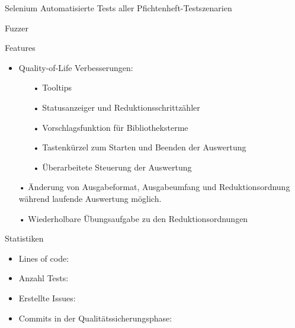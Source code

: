 \documentclass[10pt]{beamer}
\begin{document}
\begin{frame}{Selenium}
Automatisierte Tests aller Pfichtenheft-Testszenarien
\end{frame}

\begin{frame} {Fuzzer}

\end{frame}

\begin{frame}{Features}
\begin{itemize}
\item Quality-of-Life Verbesserungen:
\begin{itemize}
\item[•] Tooltips
\item[•] Statusanzeiger und Reduktionsschrittzähler
\item[•] Vorschlagsfunktion für Bibliotheksterme
\item[•] Tastenkürzel zum Starten und Beenden der Auswertung
\item[•] Überarbeitete Steuerung der Auswertung
\end{itemize}
\item[•] Änderung von Ausgabeformat, Ausgabeumfang und Reduktionsordnung während laufende Auswertung möglich.
\item[•] Wiederholbare Übungsaufgabe zu den Reduktionsordnungen
\end{itemize}
\end{frame}

\begin{frame}{Statistiken} %
\begin{itemize}
\item Lines of code:
\item Anzahl Tests:
\item Erstellte Issues:
\item Commits in der Qualitätssicherungsphase:
\end{itemize}
\end{frame}
\end{document}
